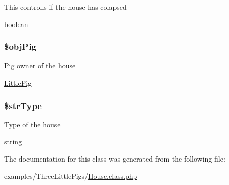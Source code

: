 This controlls if the house has colapsed

boolean \hypertarget{class_house_eeadc4737b5ad49aa0a56c7bbbafdffe}{
\subsubsection[{\$objPig}]{\setlength{\rightskip}{0pt plus 5cm}\$objPig}}
\label{class_house_eeadc4737b5ad49aa0a56c7bbbafdffe}


Pig owner of the house

\hyperlink{class_little_pig}{LittlePig} \hypertarget{class_house_ac9a08cb422ab9a398d451299b054e28}{
\subsubsection[{\$strType}]{\setlength{\rightskip}{0pt plus 5cm}\$strType}}
\label{class_house_ac9a08cb422ab9a398d451299b054e28}


Type of the house

string 

The documentation for this class was generated from the following file:\begin{CompactItemize}
\item 
examples/ThreeLittlePigs/\hyperlink{_house_8class_8php}{House.class.php}\end{CompactItemize}
